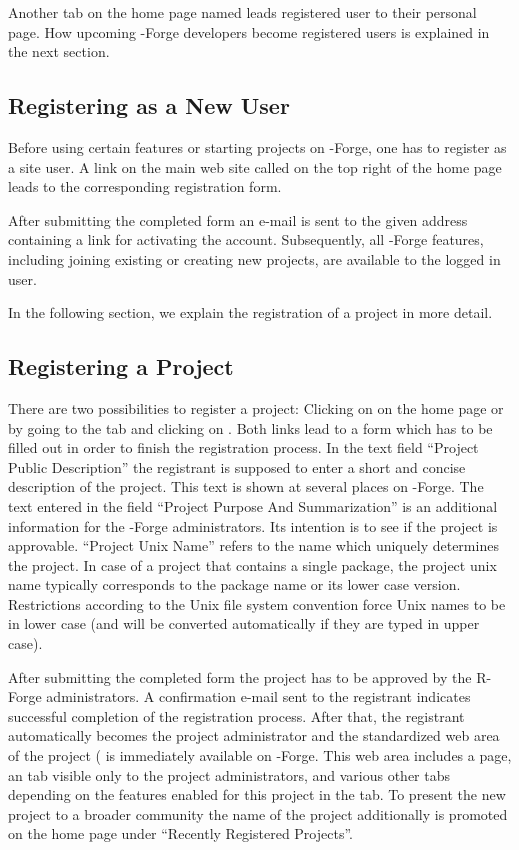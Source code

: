 Another tab on the home page named  leads registered user
to their personal page. How upcoming \R{}-Forge developers become
registered users is explained in the next section.

\subsection{Registering as a New User}

Before using certain features or starting projects on \R{}-Forge, one has
to register as a site user. A link on the main web site called
 on the top right of the home page leads to the
corresponding registration form.

After submitting the completed form an e-mail is sent to the given
address containing a link for activating the account. Subsequently,
all \R{}-Forge features, including joining existing or creating
new projects, are available to the logged in user.

In the following section, we explain the registration of a project in
more detail.  

\subsection{Registering a Project}

There are two possibilities to register a project: Clicking on
 on the home page or by going to the  tab and clicking on . Both links lead to a
form which has to be filled out in order to finish the registration
process. In the text field ``Project Public Description'' the
registrant is supposed to enter a short and concise description of the
project. This text is shown at several places on \R{}-Forge. The text
entered in the field ``Project Purpose And Summarization'' is an
additional information for the \R{}-Forge administrators. Its
intention is to see if the project is approvable. ``Project Unix
Name'' refers to the name which 
uniquely determines the project. In case of a project that contains a
single \R{} package, the project unix name typically corresponds to
the package name or its lower case version. Restrictions according to
the Unix file system convention force Unix names to be in lower case
(and will be converted automatically if they are typed in upper case).

After submitting the completed form the project has to be approved by
the R-Forge administrators. A confirmation e-mail sent to the
registrant indicates successful completion of the registration
process. After that, the registrant automatically becomes the project
administrator and the standardized web area of the project
( is
immediately available on \R{}-Forge. 
This web area includes a  page, an  tab
visible only to the project administrators, and various other tabs
depending on the features enabled for this project in the 
tab. To present the new project to a broader community the name of the
project additionally is promoted on the home page under ``Recently
Registered Projects''.

